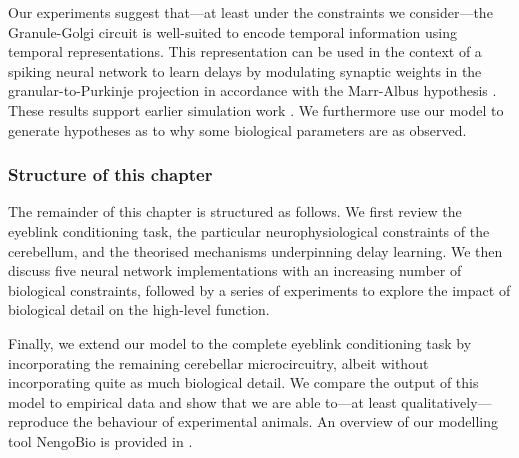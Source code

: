 Our experiments suggest that---at least under the constraints we consider---the Granule-Golgi circuit is well-suited to encode temporal information using temporal representations.
This representation can be used in the context of a spiking neural network to learn delays by modulating synaptic weights in the granular-to-Purkinje projection in accordance with the Marr-Albus hypothesis \citep{marr1969theory,albus1971theory,sanger2020expansion}.
These results support earlier simulation work \citep{rossert2015edge}.
We furthermore use our model to generate hypotheses as to why some biological parameters are as observed.

\subsubsection{Structure of this chapter}
The remainder of this chapter is structured as follows.
We first review the eyeblink conditioning task, the particular neurophysiological constraints of the cerebellum, and the theorised mechanisms underpinning delay learning.
We then discuss five neural network implementations with an increasing number of biological constraints, followed by a series of experiments to explore the impact of biological detail on the high-level function.

Finally, we extend our model to the complete eyeblink conditioning task by incorporating the remaining cerebellar microcircuitry, albeit without incorporating quite as much biological detail.
We compare the output of this model to empirical data and show that we are able to---at least qualitatively---reproduce the behaviour of experimental animals.
An overview of our modelling tool NengoBio is provided in .